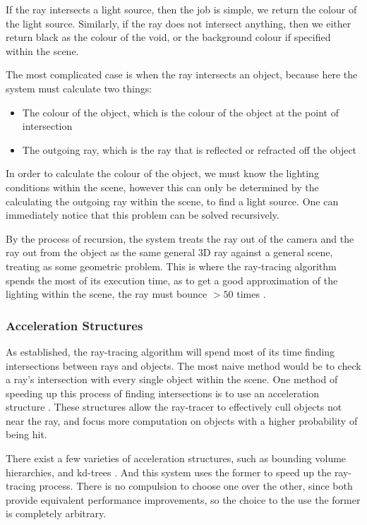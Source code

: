 \documentclass[../main.tex]{subfiles}
\begin{document}
If the ray intersects a light source, then the job is simple, we return the colour of the light source. Similarly, if the ray does not intersect anything, then we either
return black as the colour of the void, or the background colour if specified within the scene.

The most complicated case is when the ray intersects an object, because here the system must calculate two things:
\begin{itemize}
    \item The colour of the object, which is the colour of the object at the point of intersection
    \item The outgoing ray, which is the ray that is reflected or refracted off the object
\end{itemize}
In order to calculate the colour of the object, we must know the lighting conditions within the scene, however this can only be 
determined by the calculating the outgoing ray within the scene, to find a light source. One can immediately notice that this
problem can be solved recursively.

By the process of recursion, the system treats the ray out of the camera and the ray out from the object as the same general 3D ray
against a general scene, treating as some geometric problem. This is where the ray-tracing algorithm spends the
most of its execution time, as to get a good approximation of the lighting within the scene, the ray must bounce $>50$ times \cite{pharr_physically_2016}.

\subsubsection{Acceleration Structures}
As established, the ray-tracing algorithm will spend most of its time finding intersections between rays and objects. The
most naive method would be to check a ray's intersection with every single object within the scene.
One method of speeding up this process of finding intersections is to use an acceleration structure \cite{pharr_physically_2016}. These
structures allow the ray-tracer to effectively cull objects not near the ray, and focus more computation on objects with a higher probability of being hit.

There exist a few varieties of acceleration structures, such as bounding volume hierarchies, and kd-trees \cite{pharr_physically_2016, arvo_transforming_1990}. And this system uses
the former to speed up the ray-tracing process. There is no compulsion to choose one over the other, since both provide equivalent performance improvements, so the choice 
to the use the former is completely arbitrary.
\end{document}
